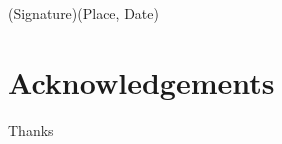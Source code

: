 \documentclass[12pt,twoside]{report}
\numberwithin{equation}{subsection}
\begin{document}
(Signature)\hfill (Place, Date)
\vspace{8.5cm}


\chapter*{Acknowledgements}
Thanks 

\tableofcontents
\listoffigures 
\listoftables















\printbibliography
\end{document}
